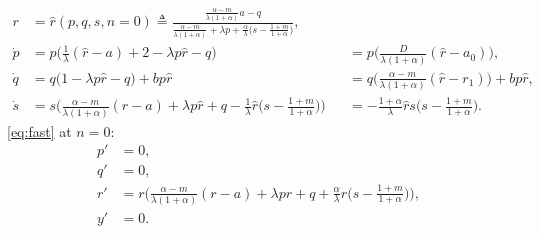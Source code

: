 \documentclass[a4paper,11pt]{article}
\begin{document}
\begin{equation}\label{eq:slow0}
 \begin{aligned}
 r &=\hat{r}(p,q,s,n=0) \triangleq \frac{ \frac{\alpha-m}{\lambda(1+\alpha)}a - q }{  \frac{\alpha-m}{\lambda(1+\alpha)} + \lambda p + \frac{\alpha}{\lambda}\big(s- \frac{1+m}{1+\alpha}\big)},\\%
 \dot{p} &=p\Big(\frac{1}{\lambda}(\hat{r}-a) + 2- \lambda p \hat{r} -q\Big) & &= p\Big(\frac{D}{\lambda(1+\alpha)}(\hat{r}-a_0)\Big),\\
 \dot{q} &=q\Big(1 -\lambda p \hat{r} -q\Big) + b p \hat{r} & &=q\Big(\frac{\alpha-m}{\lambda(1+\alpha)}(\hat{r}-r_1)\Big) + b p \hat{r},\\
 \dot{s} &=s\Big(\frac{\alpha-m}{\lambda(1+\alpha)}(\hat{r}-a) + \lambda p\hat{r} + q - \frac{1}{\lambda}\hat{r}\big(s- \frac{1+m}{1+\alpha}\big)\Big) &&= -\frac{1+\alpha}{\lambda}\hat{r}s\big(s- \frac{1+m}{1+\alpha}\big).
 \end{aligned}
\end{equation}
\eqref{eq:fast} at $n=0$:
\begin{equation} \label{eq:fast0}
 \begin{aligned}
 {p}' &=0,\\
 {q}' &=0,\\
 {r}' &=r\Big(\frac{\alpha-m}{\lambda(1+\alpha)}(r-a) + \lambda pr + q +\frac{\alpha}{\lambda}r\big(s- \frac{1+m}{1+\alpha}\big)\Big),\\
 {y}' &=0.
 \end{aligned}
\end{equation}
\end{document}
